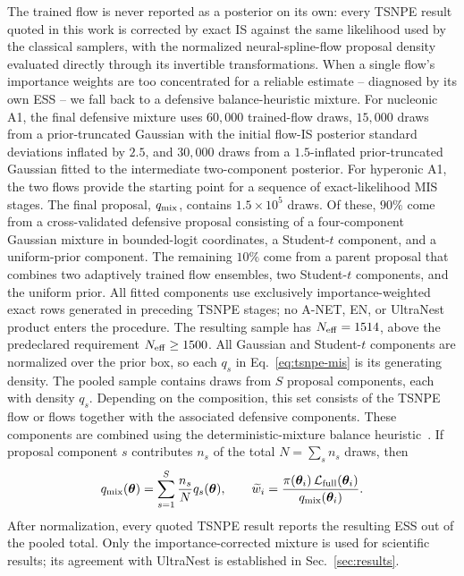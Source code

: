 \documentclass[aps,prd,twocolumn,superscriptaddress,nofootinbib,longbibliography]{revtex4-2}
\begin{document}
The trained flow is never reported as a posterior on its own: every
TSNPE result quoted in this work is corrected by exact IS
against the same likelihood used by the classical samplers,
with the normalized neural-spline-flow proposal density
evaluated directly through its invertible transformations. When a single
flow's importance weights are too
concentrated for a reliable estimate -- diagnosed by its own
ESS -- we fall back to a defensive balance-heuristic mixture.
For nucleonic A1, the final defensive mixture uses
$60{,}000$ trained-flow draws, $15{,}000$ draws from a prior-truncated
Gaussian with the initial flow-IS posterior standard deviations inflated by
$2.5$, and $30{,}000$ draws from a $1.5$-inflated prior-truncated Gaussian
fitted to the intermediate two-component posterior.
For hyperonic A1, the two flows provide the starting
point for a sequence of exact-likelihood MIS stages. The final proposal,
$q_{\rm mix}$, contains $1.5\times10^5$ draws. Of these, $90\%$ come from a
cross-validated defensive proposal consisting of a four-component Gaussian
mixture in bounded-logit coordinates, a Student-$t$ component, and a
uniform-prior component. The remaining $10\%$ come from a parent proposal that
combines two adaptively trained flow ensembles, two Student-$t$ components,
and the uniform prior. All fitted components use exclusively
importance-weighted exact rows generated in preceding TSNPE stages; no A-NET,
EN, or UltraNest product enters the procedure. The resulting
sample has $N_{\rm eff}=1514$, above the predeclared requirement
$N_{\rm eff}\geq1500$.
All Gaussian and Student-$t$ components are normalized over the prior box, so each $q_s$ in
Eq.~\eqref{eq:tsnpe-mis} is its generating density.
The pooled sample contains draws from
$S$ proposal components, each with density $q_s$. Depending on the
composition, this set consists of the TSNPE flow or flows together with the
associated defensive components. These components are combined using the deterministic-mixture
balance heuristic~\cite{Veach:1995mis}. If proposal component $s$ contributes
$n_s$ of the total $N=\sum_s n_s$ draws, then
\begin{equation}
q_{\rm mix}(\bm\theta)
=\sum_{s=1}^{S}\frac{n_s}{N}q_s(\bm\theta),
\qquad
\widetilde w_i=
\frac{\pi(\bm\theta_i)\,
\mathcal L_{\rm full}(\bm\theta_i)}
{q_{\rm mix}(\bm\theta_i)}.
\label{eq:tsnpe-mis}
\end{equation}
After normalization, every quoted TSNPE result reports the resulting
ESS out of the pooled total.
Only the importance-corrected mixture is used for
scientific results; its agreement with UltraNest is established in
Sec.~\ref{sec:results}.
\end{document}
